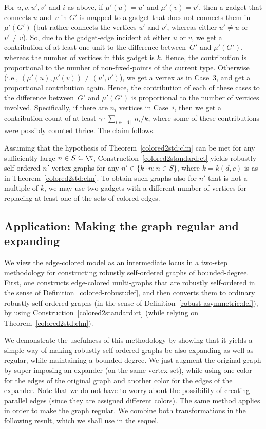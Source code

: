 For $u,v,u',v'$ and $i$ as above, if $\mu'(u)=u'$ and $\mu'(v)=v'$,
then a gadget that connects $u$ and~$v$ in $G'$
is mapped to a gadget that does not connects them in $\mu'(G')$
(but rather connects the vertices $u'$ and $v'$,
whereas either $u'\neq u$ or $v'\neq v$).
So, due to the gadget-edge incident at either $u$ or $v$,
we get a contribution of at least one unit to the
difference between~$G'$ and $\mu'(G')$,
whereas the number of vertices in this gadget is $k$.
Hence, the contribution is proportional to the
number of non-fixed-points of the current type.
Otherwise (i.e., $(\mu'(u),\mu'(v))\neq(u',v')$),
we get a vertex as in Case~3,
and get a proportional contribution again.
%
%
%
%
%
%
%
%
%
%
\EDes
Hence, the contribution of each of these cases
to the difference between~$G'$ and $\mu'(G')$
is proportional to the number of vertices involved.
Specifically, if there are $n_i$ vertices in Case~$i$,
then we get a contribution-count of
at least $\gamma\cdot\sum_{i\in[4]}n_i/k$,
%
where some of these contributions were possibly counted thrice.
The claim follows.
\EPF

\label{colored2std:rem}
Assuming that the hypothesis of Theorem~\ref{colored2std:clm}
can be met for any sufficiently large $n\in S\subseteq\N$,
Construction~\ref{colored2standard:ct} yields robustly
self-ordered $n'$-vertex graphs for any $n'\in\{k\cdot n:n\!\in\!S\}$,
where $k=k(d,c)$ is as in Theorem~\ref{colored2std:clm}.
To obtain such graphs also for $n'$ that is not a multiple of $k$,
we may use two gadgets with a different number of vertices
for replacing at least one of the sets of colored edges.
\ER

\subsection{Application: Making the graph regular and expanding}
\label{edge-colored:applic:sec}
We view the edge-colored model as an intermediate locus
in a two-step methodology for constructing
robustly self-ordered graphs of bounded-degree.
First, one constructs edge-colored multi-graphs that
are robustly self-ordered
in the sense of Definition~\ref{colored-robust:def},
and then converts them to ordinary robustly self-ordered graphs
(in the sense of Definition~\ref{robust-asymmetric:def}),
by using Construction~\ref{colored2standard:ct}
(while relying on Theorem~\ref{colored2std:clm}).

We demonstrate the usefulness of this methodology
by showing that it yields a simple way of
making robustly self-ordered graphs be also expanding
as well as regular, while maintaining a bounded degree.
%
We just augment the original graph by super-imposing
an expander (on the same vertex set),
while using one color for the edges of the original graph
and another color for the edges of the expander.
Note that we do not have to worry about the possibility of
creating parallel edges (since they are assigned different colors).
The same method applies in order to make the graph regular.
We combine both transformations in the following result,
which we shall use in the sequel.

